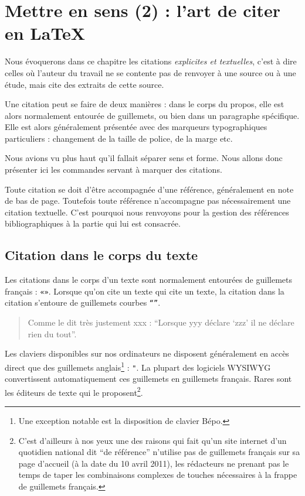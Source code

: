 \chapter{Mettre en sens (2) : l'art de citer en LaTeX}\label{citertexte}

\begin{prealable}
Nous évoquerons dans ce chapitre les citations \emph{explicites et textuelles}, c'est à dire celles où l'auteur du travail ne se contente pas de renvoyer à une source ou à une étude, mais cite des extraits de cette source.

Une citation peut se faire de deux manières : dans le corps du propos, elle est alors normalement entourée de guillemets, ou bien dans un paragraphe spécifique. Elle est alors généralement présentée avec des marqueurs typographiques particuliers : changement de la taille de police, de la marge etc.

Nous avions vu plus haut qu'il fallait séparer sens et forme. Nous allons donc présenter ici les commandes servant à marquer des citations.

\end{prealable}
\begin{attention}
Toute citation se doit d'être accompagnée d'une référence, généralement en note de bas de page. Toutefois toute référence n'accompagne pas nécessairement une citation textuelle. C'est pourquoi nous renvoyons pour la gestion des références bibliographiques à la partie qui lui est consacrée.

\end{attention}

\section{Citation dans le corps du texte}\label{guillemets}

Les citations dans le corps d'un texte sont normalement entourées de guillemets français : \verb|«»|. Lorsque qu'on cite un texte qui cite un texte, la citation dans la citation s'entoure de guillemets courbes \verb|“”|. 

\begin{quotation}
    Comme le dit très justement xxx : \enquote{Lorsque yyy déclare \enquote{zzz} il ne déclare rien du tout}.
\end{quotation}

Les claviers disponibles sur nos ordinateurs ne disposent généralement en accès direct que des guillemets anglais\footnote{Une exception notable est la disposition de clavier Bépo.} : \verb|"|. 
La plupart des logiciels WYSIWYG convertissent automatiquement ces guillemets en guillemets français. Rares sont les éditeurs de texte qui le proposent\footnote{C'est d'ailleurs à nos yeux une des raisons qui fait qu'un site internet d'un quotidien national dit \enquote{de référence} n'utilise pas de guillemets français sur sa page d'accueil (à la date du 10 avril 2011), les rédacteurs ne prenant pas le temps de taper les combinaisons complexes de touches nécessaires à la frappe de guillemets français.}. 

